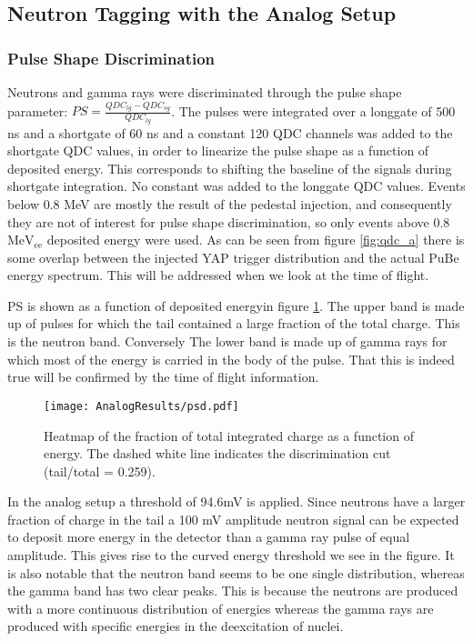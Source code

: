\documentclass[main.tex]{subfiles}
\begin{document}
\subsection{Neutron Tagging with the Analog Setup}
\subsubsection{Pulse Shape Discrimination}
Neutrons and gamma rays were discriminated through the pulse shape parameter: \newline$PS=\frac{QDC_{lg}-QDC_{sg}}{QDC_{lg}}$. The pulses were integrated over a longgate of 500 ns and a shortgate of 60 ns and a constant 120 QDC channels was added to the shortgate QDC values, in order to linearize the pulse shape as a function of deposited energy. This corresponds to shifting the baseline of the signals during shortgate integration. No constant was added to the longgate QDC values. Events below 0.8 MeV are mostly the result of the pedestal injection, and consequently they are not of interest for pulse shape discrimination,  so only events above 0.8 $\text{MeV}_\text{ee}$ deposited energy were used. As can be seen from figure \ref{fig:qdc_a} there is some overlap between the injected YAP trigger distribution and the actual PuBe energy spectrum. This will be addressed when we look at the time of flight.

PS is shown as a function of deposited energyin figure \ref{fig:psd_a}. The upper band is made up of pulses for which the tail contained a large fraction of the total charge. This is the neutron band. Conversely The lower band is made up of gamma rays for which most of the energy is carried in the body of the pulse. That this is indeed true will be confirmed by the time of flight information.

\begin{figure}[ht]
    \centering
        \texttt{[image: AnalogResults/psd.pdf]}
        \caption{Heatmap of the fraction of total integrated charge as a function of energy. The dashed white line indicates the discrimination cut (tail/total = 0.259).}
        \label{fig:psd_a}
\end{figure}
In the analog setup a threshold of 94.6\si{\milli\volt} is applied. Since neutrons have a larger fraction of charge in the tail a 100 mV amplitude neutron signal can be expected to deposit more energy in the detector than a gamma ray pulse of equal amplitude. This gives rise to the curved energy threshold we see in the figure. It is also notable that the neutron band seems to be one single distribution, whereas the gamma band has two clear peaks. This is because the neutrons are produced with a more continuous distribution of energies whereas the gamma rays are produced with specific energies in the deexcitation of nuclei.
\end{document}
